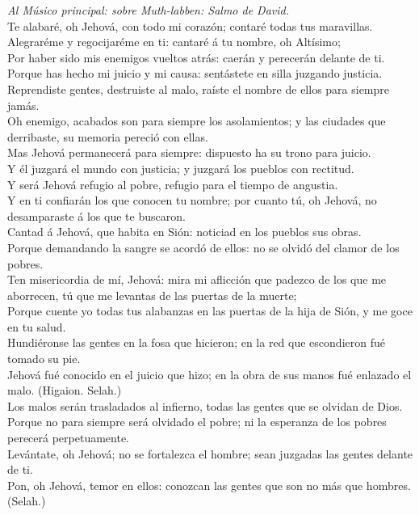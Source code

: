  \emph{Al Músico principal: sobre Muth-labben: Salmo de
David.}\\
Te alabaré, oh Jehová, con todo mi corazón; contaré todas tus
maravillas.\\
 Alegraréme y regocijaréme en ti: cantaré á tu nombre, oh
Altísimo;\\
 Por haber sido mis enemigos vueltos atrás: caerán y
perecerán delante de ti.\\
 Porque has hecho mi juicio y mi causa: sentástete en silla
juzgando justicia.\\
 Reprendiste gentes, destruiste al malo, raíste el nombre de
ellos para siempre jamás.\\
 Oh enemigo, acabados son para siempre los asolamientos; y
las ciudades que derribaste, su memoria pereció con ellas.\\
 Mas Jehová permanecerá para siempre: dispuesto ha su trono
para juicio.\\
 Y él juzgará el mundo con justicia; y juzgará los pueblos
con rectitud.\\
 Y será Jehová refugio al pobre, refugio para el tiempo de
angustia.\\
 Y en ti confiarán los que conocen tu nombre; por cuanto
tú, oh Jehová, no desamparaste á los que te buscaron.\\
 Cantad á Jehová, que habita en Sión: noticiad en los
pueblos sus obras.\\
 Porque demandando la sangre se acordó de ellos: no se
olvidó del clamor de los pobres.\\
 Ten misericordia de mí, Jehová: mira mi aflicción que
padezco de los que me aborrecen, tú que me levantas de las puertas de la
muerte;\\
 Porque cuente yo todas tus alabanzas en las puertas de la
hija de Sión, y me goce en tu salud.\\
 Hundiéronse las gentes en la fosa que hicieron; en la red
que escondieron fué tomado su pie.\\
 Jehová fué conocido en el juicio que hizo; en la obra de
sus manos fué enlazado el malo. (Higaion. Selah.)\\
 Los malos serán trasladados al infierno, todas las gentes
que se olvidan de Dios.\\
 Porque no para siempre será olvidado el pobre; ni la
esperanza de los pobres perecerá perpetuamente.\\
 Levántate, oh Jehová; no se fortalezca el hombre; sean
juzgadas las gentes delante de ti.\\
 Pon, oh Jehová, temor en ellos: conozcan las gentes que
son no más que hombres. (Selah.)

